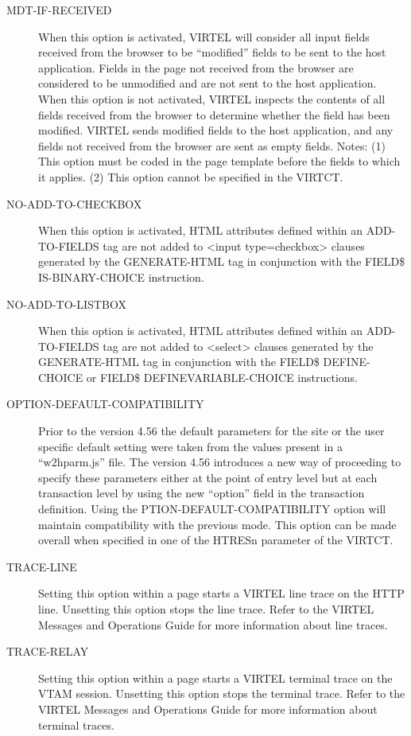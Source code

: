 \documentclass[letterpaper,10pt,english]{sphinxmanual}
\begin{document}
\begin{description}
\item[{MDT-IF-RECEIVED}] \leavevmode
When this option is activated, VIRTEL will consider all input fields received from the browser to be “modified” fields to be sent to the host application. Fields in the page not received from the browser are considered to be unmodified and are not sent to the host application. When this option is not activated, VIRTEL inspects the contents of all fields received from the browser to determine whether the field has been modified. VIRTEL sends modified fields to the host application, and any fields not received from the browser are sent as empty fields. Notes: (1) This option must be coded in the page template before the fields to which it applies. (2) This option cannot be specified in the VIRTCT.

\item[{NO-ADD-TO-CHECKBOX}] \leavevmode
When this option is activated, HTML attributes defined within an ADD-TO-FIELDS tag are not added to \textless{}input type=checkbox\textgreater{} clauses generated by the GENERATE-HTML tag in conjunction with the FIELD\$ IS-BINARY-CHOICE instruction.

\item[{NO-ADD-TO-LISTBOX}] \leavevmode
When this option is activated, HTML attributes defined within an ADD-TO-FIELDS tag are not added to \textless{}select\textgreater{} clauses generated by the GENERATE-HTML tag in conjunction with the FIELD\$ DEFINE-CHOICE or FIELD\$ DEFINEVARIABLE-CHOICE instructions.

\item[{OPTION-DEFAULT-COMPATIBILITY}] \leavevmode
Prior to the version 4.56 the default parameters for the site or the user specific default setting were taken from the values present in a “w2hparm.js” file. The version 4.56 introduces a new way of proceeding to specify these parameters either at the point of entry level but at each transaction level by using the new “option” field in the transaction definition. Using the PTION-DEFAULT-COMPATIBILITY option will maintain compatibility with the previous mode. This option can be made overall when specified in one of the HTRESn parameter of the VIRTCT.

\item[{TRACE-LINE}] \leavevmode
Setting this option within a page starts a VIRTEL line trace on the HTTP line. Unsetting this option stops the line trace. Refer to the VIRTEL Messages and Operations Guide for more information about line traces.

\item[{TRACE-RELAY}] \leavevmode
Setting this option within a page starts a VIRTEL terminal trace on the VTAM session. Unsetting this option stops the terminal trace. Refer to the VIRTEL Messages and Operations Guide for more information about terminal traces.

\end{description}
\end{document}
